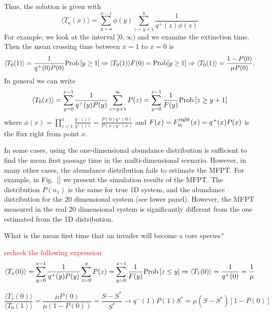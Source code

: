 \documentclass[%
 amsmath,amssymb,
 reprint,%
]{revtex4-2}
\begin{document}
\begin{widetext}
Thus, the solution is given with 
\begin{equation}
   \langle T_a(x) \rangle =   \sum_{y=a}^{x-1}\phi(y)\sum_{z=y+1}^{b}\frac{1}{q^+(z)\phi(z)} 
\end{equation}
For example, we look at the interval $[0,\infty)$ and we examine the extinction time. Then the mean crossing time between $x=1$ to $x=0$ is
\begin{equation}
   \langle T_0(1) \rangle =   \frac{1}{q^+(0)P(0)}{\rm Prob}\left[y\geq 1\right]\Rightarrow \langle T_0(1)
   \rangle F(0)= {\rm Prob}[y\geq 1]\Rightarrow \langle T_0(1)\rangle = \frac{1-P(0)}{\mu P(0)} .
\end{equation}
In general we can write
\begin{equation}
   \langle T_0(x) \rangle =   \sum_{y=0}^{x-1}\frac{1}{q^+(y)P(y)}\sum_{z=y+1}^{\infty}{P(z)} =  \sum_{y=0}^{x-1}\frac{1}{F(y)}{\rm Prob}\left[z\geq y+1\right]
\end{equation}
where  $\phi(x)=\prod_{z=1}^{x}\frac{q^-(z)}{q^+(z)}= \frac{P(0)q^+(0)}{P(x)q^+(x)}$ and $F(x)=F_{\rm in}^{\rm right}(x)=q^+(x)P(x)$ is the flux right from point $x$. 

In some cases, using the one-dimensional abundance distribution is sufficient to find the mean first passage time in the multi-dimensional scenario. 
However, in many other cases, the abundance distribution fails to estimate the MFPT. For example, in Fig.~\ref{}  we present the simulation results of the MFPT. 
The distribution $P(n_1)$ is the same for true 1D system, and the abundance distribution for the 20 dimensional system (see lower panel). 
However, the MFPT measured in the real 20 dimensional system is significantly different from the one estimated from the 1D distribution. 

What is the mean first time that an invader will become a core species? 

\textcolor{red}{recheck the following expression}
\begin{equation}
   \langle T_x(0) \rangle =   \sum_{y=0}^{x-1}\frac{1}{q^+(y)P(y)}\sum_{z=0}^{y}{P(z)} =  \sum_{y=0}^{x-1}\frac{1}{F(y)}{\rm Prob}\left[z\leq y\right] \Rightarrow \langle T_1(0) \rangle = \frac{1}{q^+(0)}=\frac{1}{\mu}
\end{equation}

\begin{equation}
   \frac{\langle T_1(0) \rangle}{\langle T_0(1) \rangle} = \frac{\mu P(0)}{\mu(1-P(0))} = \frac{S-S^*}{S^*} \rightarrow q^-(1)P(1) S^* = \mu (S-S^*)[1-P(0)]
\end{equation}


\end{widetext}
\end{document}
